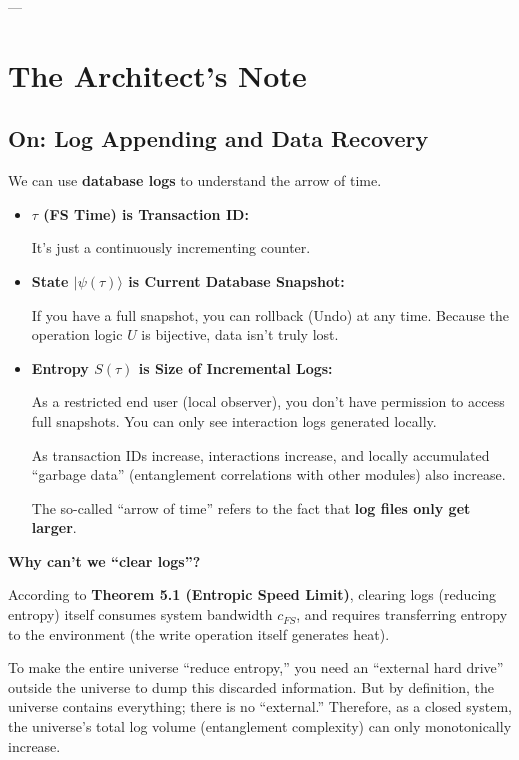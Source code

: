 \documentclass[11pt,a4paper,twoside]{book}
\begin{document}
---

\section{The Architect's Note}

\subsection{On: Log Appending and Data Recovery}

We can use \textbf{database logs} to understand the arrow of time.

\begin{itemize}
\item \textbf{$\tau$ (FS Time) is Transaction ID:}

    It's just a continuously incrementing counter.

\item \textbf{State $|\psi(\tau)\rangle$ is Current Database Snapshot:}

    If you have a full snapshot, you can rollback (Undo) at any time. Because the operation logic $U$ is bijective, data isn't truly lost.

\item \textbf{Entropy $S(\tau)$ is Size of Incremental Logs:}

    As a restricted end user (local observer), you don't have permission to access full snapshots. You can only see interaction logs generated locally.

    As transaction IDs increase, interactions increase, and locally accumulated ``garbage data'' (entanglement correlations with other modules) also increase.

    The so-called ``arrow of time'' refers to the fact that \textbf{log files only get larger}.
\end{itemize}

\textbf{Why can't we ``clear logs''?}

According to \textbf{Theorem 5.1 (Entropic Speed Limit)}, clearing logs (reducing entropy) itself consumes system bandwidth $c_{FS}$, and requires transferring entropy to the environment (the write operation itself generates heat).

To make the entire universe ``reduce entropy,'' you need an ``external hard drive'' outside the universe to dump this discarded information. But by definition, the universe contains everything; there is no ``external.'' Therefore, as a closed system, the universe's total log volume (entanglement complexity) can only monotonically increase.
\end{document}
